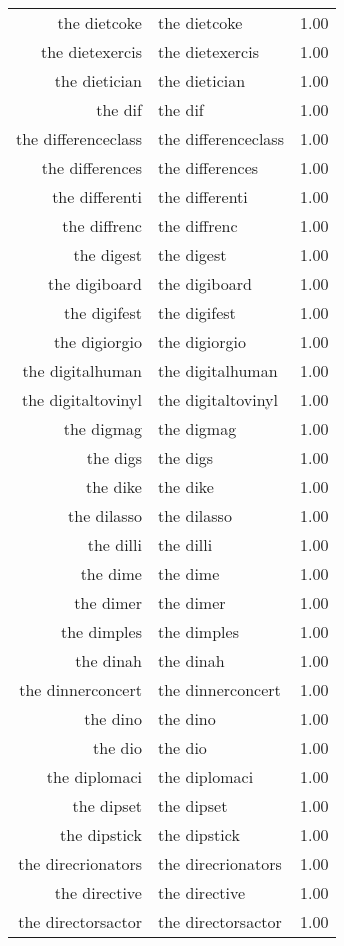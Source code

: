 \begin{table}[ht]
\begin{tabular}{rlr}
  the dietcoke & the dietcoke & 1.00 \\ 
  the dietexercis & the dietexercis & 1.00 \\ 
  the dietician & the dietician & 1.00 \\ 
  the dif & the dif & 1.00 \\ 
  the differenceclass & the differenceclass & 1.00 \\ 
  the differences & the differences & 1.00 \\ 
  the differenti & the differenti & 1.00 \\ 
  the diffrenc & the diffrenc & 1.00 \\ 
  the digest & the digest & 1.00 \\ 
  the digiboard & the digiboard & 1.00 \\ 
  the digifest & the digifest & 1.00 \\ 
  the digiorgio & the digiorgio & 1.00 \\ 
  the digitalhuman & the digitalhuman & 1.00 \\ 
  the digitaltovinyl & the digitaltovinyl & 1.00 \\ 
  the digmag & the digmag & 1.00 \\ 
  the digs & the digs & 1.00 \\ 
  the dike & the dike & 1.00 \\ 
  the dilasso & the dilasso & 1.00 \\ 
  the dilli & the dilli & 1.00 \\ 
  the dime & the dime & 1.00 \\ 
  the dimer & the dimer & 1.00 \\ 
  the dimples & the dimples & 1.00 \\ 
  the dinah & the dinah & 1.00 \\ 
  the dinnerconcert & the dinnerconcert & 1.00 \\ 
  the dino & the dino & 1.00 \\ 
  the dio & the dio & 1.00 \\ 
  the diplomaci & the diplomaci & 1.00 \\ 
  the dipset & the dipset & 1.00 \\ 
  the dipstick & the dipstick & 1.00 \\ 
  the direcrionators & the direcrionators & 1.00 \\ 
  the directive & the directive & 1.00 \\ 
  the directorsactor & the directorsactor & 1.00 \\ 

\end{tabular}
\end{table}
